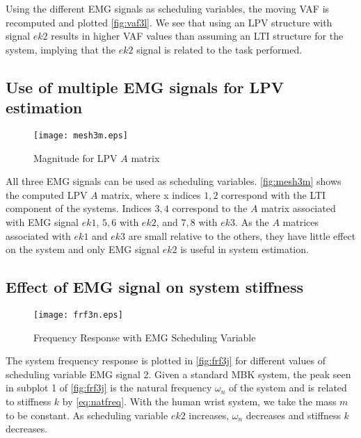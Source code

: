 \documentclass[11pt,a4paper]{article}
\begin{document}
Using the different EMG signals as scheduling variables, the moving VAF is
recomputed and plotted \autoref{fig:vaf3l}. We see that using an LPV structure
with signal $ek2$ results in higher VAF values than assuming an LTI structure
for the system, implying that the $ek2$ signal is related to the task
performed.

\subsection{Use of multiple EMG signals for LPV estimation}
\begin{figure}
    \centering
    \texttt{[image: mesh3m.eps]}
    \caption{Magnitude for LPV $A$ matrix}
    \label{fig:mesh3m}
\end{figure}
All three EMG signals can be used as scheduling variables. \autoref{fig:mesh3m}
shows the computed LPV $A$ matrix, where x indices $1, 2$ correspond with the
LTI component of the systems. Indices $3, 4$ correspond to the $A$ matrix
associated with EMG signal $ek1$, $5, 6$ with $ek2$, and $7, 8$ with $ek3$. As
the $A$ matrices associated with $ek1$ and $ek3$ are small relative to the
others, they have little effect on the system and only EMG signal $ek2$ is
useful in system estimation.

\subsection{Effect of EMG signal on system stiffness}
\begin{figure}
    \centering
    \texttt{[image: frf3n.eps]}
    \caption{Frequency Response with EMG Scheduling Variable}
    \label{fig:frf3j}
\end{figure}
The system frequency response is plotted in \autoref{fig:frf3j} for different
values of scheduling variable EMG signal 2. Given a standard MBK system, the
peak seen in subplot 1 of \autoref{fig:frf3j} is the natural frequency
$\omega_n$ of the system and is related to stiffness $k$ by
\autoref{eq:natfreq}. With the human wrist system, we take the mass $m$ to be
constant. As scheduling variable $ek2$ increases, $\omega_n$ decreases and
stiffness $k$ decreases.
\end{document}
